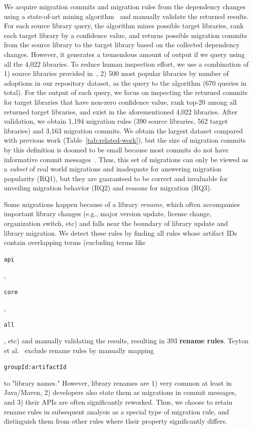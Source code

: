 \documentclass[sigconf, screen]{acmart}
\newcommand{\Code}[1]{\begin{small}\texttt{#1}\end{small}}
\begin{document}
We acquire migration commits and migration rules from the dependency changes using a state-of-art mining algorithm~\cite{he2021multi} and manually validate the returned results.
For each source library query, the algorithm mines possible target libraries, %
rank each target library by a confidence value, and returns possible migration commits from the source library to the target library based on the collected dependency changes.
However, it generates a tremendous amount of output if we query using all the 4,022 libraries.
To reduce human inspection effort, we use a combination of 1) source libraries provided in~\cite{teyton2012mining}, 2) 500 most popular libraries by number of adoptions in our repository dataset, as the query to the algorithm (670 queries in total).
For the output of each query, we focus on inspecting the returned commits for target libraries that have non-zero confidence value, rank top-20 among all returned target libraries, and exist in the aforementioned 4,022 libraries.
After validation, we obtain 1,194 migration rules (390 source libraries, 562 target libraries) and 3,163 migration commits.
We obtain the largest dataset compared with previous work (Table~\ref{tab:related-work}), but the size of migration commits by this definition is doomed to be small because most commits do not have informative commit messages~\cite{cortes2014automatically}.
Thus, this set of migrations can only be viewed as a \textit{subset} of real world migrations
and inadequate for answering migration popularity (RQ1), but they are guaranteed to be correct and invaluable for unveiling migration behavior (RQ2) and reasons for migration (RQ3).

Some migrations happen because of a library \textit{rename}, which often accompanies important library changes (e.g., major version update, license change, organization switch, etc) and falls near the boundary of library update and library migration.
We detect these rules by finding all rules whose artifact IDs contain overlapping terms (excluding terms like \Code{api}, \Code{core}, \Code{all}, etc) and manually validating the results, resulting in 393 \textbf{rename rules}.
Teyton et al.~\cite{teyton2014study} exclude rename rules by manually mapping \Code{groupId:artifactId} to "library names."
However, library renames are 1) very common at least in Java/Maven, 2) developers also state them as migrations in commit messages, and 3) their APIs are often significantly reworked. 
Thus, we choose to retain rename rules in subsequent analysis as a special type of migration rule, and distinguish them from other rules where their property significantly differs.
\end{document}
